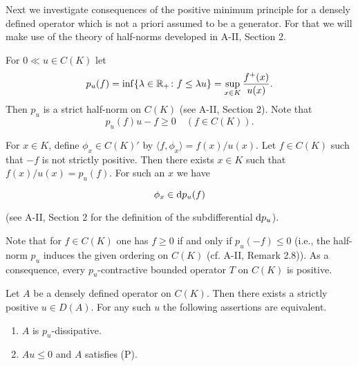 Next we investigate consequences of the positive minimum principle for a densely defined operator which is not a priori assumed to be a generator.
For that we will make use of the theory of half-norms developed in A-II, Section 2.

For $0  \ll u \in C(K)$ let
\begin{equation}\label{eq:b2-1.4}
p_{u}(f) = \inf\{\lambda \in \mathbb{R}_{+} \colon f \leq \lambda u\} = \sup_{x \in K} \frac{f^{+}(x)}{u(x)}.
\end{equation}
Then $p_{u}$ is a strict half-norm on $C(K)$ (see A-II, Section  2).
Note that
\begin{equation}\label{eq:b2-1.5}
p_{u}(f)u - f \geq 0 \quad (f \in C(K)).
\end{equation}

For $x \in K$, define $\phi_{x} \in C(K)'$ by $\langle f,\phi_{x} \rangle = f(x)/u(x)$.
Let $f \in C(K)$ such that $-f$ is not strictly positive.
Then there exists $x \in K$ such that $f(x)/u(x) = p_{u}(f)$.
For such an $x$ we have

\begin{equation}\label{eq:b2-1.6}
\phi_{x} \in \mathop{}\!\mathrm{d}{p}_{u}(f)
\end{equation}


(see A-II, Section 2 for the definition of the subdifferential $\mathop{}\!\mathrm{d}{p}_{u}$).

Note that for $f \in C(K)$ one has $f \geq 0$ if and only if $p_{u}(-f) \leq 0$ (i.e., the half-norm $p_{u}$ induces the given ordering on $C(K)$ (cf. A-II, Remark 2.8)).
As a consequence, every $p_{u}$-contractive bounded operator $T$ on $C(K)$ is positive.

\begin{proposition}\label{prop:b2-1.10}
Let $A$ be a densely defined operator on $C(K)$.
Then there exists a strictly positive $u \in D(A)$.
For any such $u$ the following assertions are equivalent.
\begin{enumerate}[\upshape (a)]
\item  \label{prop:b2-1.10-1}
$A$ is $p_{u}$-dissipative.

\item  \label{prop:b2-1.10-2}
$Au \leq 0$ and $A$ satisfies (P).
\end{enumerate}
\end{proposition}

